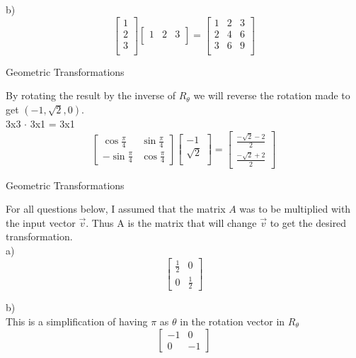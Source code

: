 \documentclass[12pt]{article}
\newcommand{\sqbrl}{\left[}
\newcommand{\sqbrr}{\right]}
\newenvironment{problem}[2][Problem]{\begin{trivlist}
\item[\hskip \labelsep {\bfseries #1}\hskip \labelsep {\bfseries #2.}]}{\end{trivlist}}
\begin{document}
b)\\
	\[\sqbrl\begin{matrix}1\\2\\3\\\end{matrix}\sqbrr\sqbrl\begin{matrix}1 & 2 & 3\\\end{matrix}\sqbrr
	=\sqbrl\begin{matrix}1 & 2 & 3\\2 & 4 & 6\\3 & 6 & 9\\\end{matrix}\sqbrr\]
	
\begin{problem}{4}
	Geometric Transformations
\end{problem}
By rotating the result by the inverse of $R_\theta$ we will reverse the rotation made to get $(-1, \sqrt{2}, 0)$.\\
3x3 $\cdot$ 3x1 = 3x1
	\[\sqbrl\begin{matrix}\cos{\frac{\pi}{4}} & \sin{\frac{\pi}{4}}\\-\sin{\frac{\pi}{4}} & \cos{\frac{\pi}{4}}\end{matrix}\sqbrr\sqbrl\begin{matrix}-1\\\sqrt{2}\\\end{matrix}\sqbrr
	= \sqbrl\begin{matrix}\frac{-\sqrt{2}-2}{2}\\\frac{-\sqrt{2}+2}{2}\end{matrix}\sqbrr\]
	
\begin{problem}{5}
	Geometric Transformations
\end{problem}
For all questions below, I assumed that the matrix $A$ was to be multiplied with the input vector $\vec v$. Thus A is the matrix that will change $\vec v$ to get the desired transformation.\\

a)\\
	\[\sqbrl\begin{matrix}\frac{1}{2} & 0\\0 & \frac{1}{2}\end{matrix}\sqbrr\]
	
b)\\ This is a simplification of having $\pi$ as $\theta$ in the rotation vector in $R_{\theta}$\\
	\[\sqbrl\begin{matrix}-1 & 0\\0 & -1\end{matrix}\sqbrr\]
	
\end{document}
